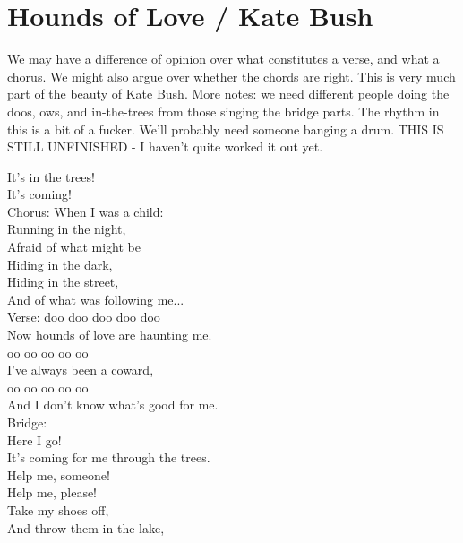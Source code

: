 \section{Hounds of Love / Kate Bush}\label{sec:hounds_of_love}
  {\small We may have a difference of opinion over what constitutes a verse, and what a chorus. We might also argue over whether the chords are right. This is very much part of the beauty of Kate Bush. More notes: we need different people doing the doos, ows, and in-the-trees from those singing the bridge parts. The rhythm in this is a bit of a fucker. We'll probably need someone banging a drum. THIS IS STILL UNFINISHED - I haven't quite worked it out yet.}
  
  \Fmajor
  \Cmajor
  \BflatMajor
  \Aminor
  
  It's in the trees!\\
  It's coming!\\
  Chorus:
  When I was a child:\\
  Running in the night,\\
  Afraid of what might be\\
  Hiding in the dark,\\
  Hiding in the street,\\
  And of what was following me...\\
  Verse:
  doo doo doo doo doo\\
  Now hounds of love are haunting me. \\
  oo oo oo oo oo \\
  I've always been a coward,\\
  oo oo oo oo oo \\
  And I don't know what's good for me.\\
  Bridge:\\
  Here I go!\\
  It's coming for me through the trees.\\
  Help me, someone!\\
  Help me, please!\\
  Take my shoes off,\\
  And throw them in the lake,\\

